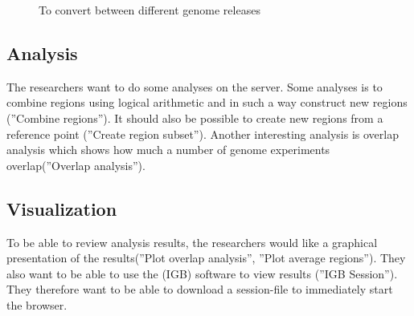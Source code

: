 \begin{figure}[h]
\caption{To convert between different genome releases}
\label{fig:target_genome}
\end{figure}

\subsection{Analysis}
The researchers want to do some analyses on the server. Some analyses is to combine regions using logical arithmetic and in such a way construct new regions (''Combine regions''). It should also be possible to create new regions from a reference point (''Create region subset''). Another interesting analysis is overlap analysis which shows how much a number of genome experiments overlap(''Overlap analysis'').

\subsection{Visualization}
To be able to review analysis results, the researchers would like a graphical presentation of the results(''Plot overlap analysis'', ''Plot average regions''). They also want to be able to use the  (IGB) software to view results (''IGB Session''). They therefore want to be able to download a session-file to immediately start the browser.